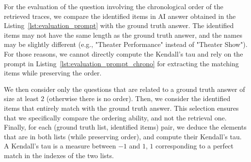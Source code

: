 \documentclass{article}
\begin{document}
For the evaluation of the question involving the chronological order of the retrieved traces, we compare the identified items in AI answer obtained in the Listing~\ref{lst:evaluation_prompt} with the ground truth answer.
The identified items may not have the same length as the ground truth answer, and the names may be slightly different (e.g., "Theater Performance" instead of "Theater Show"). For those reasons, we cannot directly compute the Kendall's tau and rely on the prompt in Listing~\ref{lst:evaluation_prompt_chrono} for extracting the matching items while preserving the order.

We then consider only the questions that are related to a ground truth answer of size at least $2$ (otherwise there is no order). Then, we consider the identified items that entirely match with the ground truth answer. 
This selection ensures that we specifically compare the ordering ability, and not the retrieval one. Finally, for each (ground truth list, identified items) pair, we deduce the elements that are in both lists (while preserving order), and compute their Kendall's tau. A Kendall's tau is a measure between $-1$ and $1$, $1$ corresponding to a perfect match in the indexes of the two lists.
\end{document}
